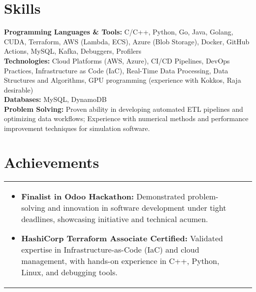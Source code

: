 \documentclass[a4paper,10pt]{article}
\begin{document}
\vspace{-1mm}
\section{Skills}
\color[HTML]{1C033C}\textbf{Programming Languages \& Tools:} C/C++, Python, Go, Java, Golang, CUDA,  Terraform, AWS (Lambda, ECS), Azure (Blob Storage), Docker, GitHub Actions, MySQL, Kafka, Debuggers, Profilers\\[1pt]
\color[HTML]{1C033C}\textbf{Technologies:} Cloud Platforms (AWS, Azure), CI/CD Pipelines, DevOps Practices, Infrastructure as Code (IaC), Real-Time Data Processing, Data Structures and Algorithms,  GPU programming (experience with Kokkos, Raja desirable)\\[1pt]
\color[HTML]{1C033C}\textbf{Databases:} MySQL, DynamoDB\\[1pt]
\color[HTML]{1C033C}\textbf{Problem Solving:} Proven ability in developing automated ETL pipelines and optimizing data workflows;  Experience with numerical methods and performance improvement techniques for simulation software.\\[1pt]
\vspace{-6mm}


\section{Achievements}

\begin{tabularx}{\linewidth}{ @{}l r@{} }
\begin{minipage}[t]{\linewidth}
\begin{itemize}[nosep,after=\strut, leftmargin=2em]
\item \textbf{Finalist in Odoo Hackathon:} Demonstrated problem-solving and innovation in software development under tight deadlines, showcasing initiative and technical acumen. 
\item \textbf{HashiCorp Terraform Associate Certified:} Validated expertise in Infrastructure-as-Code (IaC) and cloud management, with hands-on experience in C++, Python, Linux, and debugging tools.
\end{itemize}
\end{minipage}
\end{tabularx}
\end{document}

